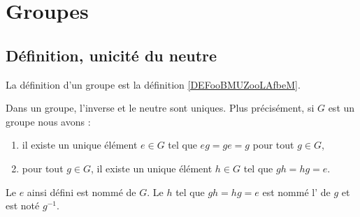 
\section{Groupes}

\subsection{Définition, unicité du neutre}

La définition d'un groupe est la définition \ref{DEFooBMUZooLAfbeM}.

\begin{lemmaDef}[Unicités]  \label{LEMooECDMooCkWxXf}
	Dans un groupe, l'inverse et le neutre sont uniques. Plus précisément, si \( G\) est un groupe nous avons :
	\begin{enumerate}
		\item
		      il existe un unique élément \( e\in G\) tel que \( e g=g e=g\) pour tout \( g\in G\),
		\item       \label{ITEMooOIWTooYqmMPP}
		      pour tout \( g\in G\), il existe un unique élément \( h\in  G\) tel que \(g h=h g=e \).
	\end{enumerate}
	Le \( e\) ainsi défini est nommé  de \( G\). Le \( h\) tel que \( g h=h g=e\) est nommé l' de \( g\) et est noté \( g^{-1}\).
\end{lemmaDef}

